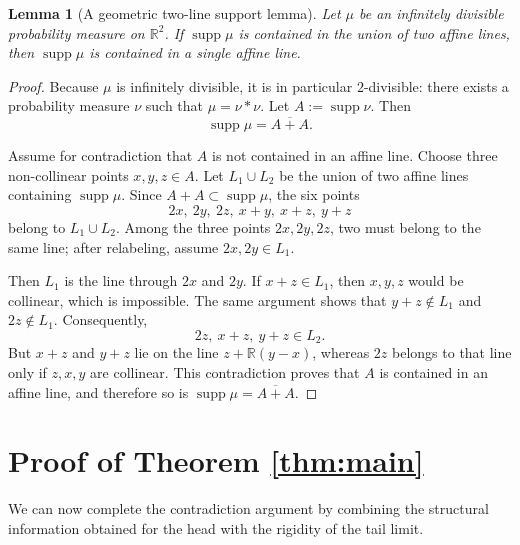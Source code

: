 \documentclass[11pt]{amsart}
\newtheorem{lemma}[theorem]{Lemma}
\newcommand{\R}{\mathbb R}
\newcommand{\supp}{\operatorname{supp}}
\begin{document}
\begin{lemma}[A geometric two-line support lemma]
\label{lem:two-line}
Let $\mu$ be an infinitely divisible probability measure on $\R^2$. If
$\supp \mu$ is contained in the union of two affine lines, then
$\supp \mu$ is contained in a single affine line.
\end{lemma}

\begin{proof}
Because $\mu$ is infinitely divisible, it is in particular $2$-divisible:
there exists a probability measure $\nu$ such that $\mu=\nu * \nu$.
Let $A := \supp \nu$. Then
\[
\supp \mu = \overline{A+A}.
\]

Assume for contradiction that $A$ is not contained in an affine line. Choose
three non-collinear points $x,y,z \in A$. Let $L_1 \cup L_2$ be the union of
two affine lines containing $\supp \mu$. Since $A+A \subset \supp \mu$, the six
points
\[
2x,\ 2y,\ 2z,\ x+y,\ x+z,\ y+z
\]
belong to $L_1 \cup L_2$. Among the three points $2x,2y,2z$, two must belong
to the same line; after relabeling, assume $2x,2y \in L_1$.

Then $L_1$ is the line through $2x$ and $2y$. If $x+z \in L_1$, then $x,y,z$
would be collinear, which is impossible. The same argument shows that
$y+z \notin L_1$ and $2z \notin L_1$. Consequently,
\[
2z,\ x+z,\ y+z \in L_2.
\]
But $x+z$ and $y+z$ lie on the line $z+\R(y-x)$, whereas $2z$ belongs to that
line only if $z,x,y$ are collinear. This contradiction proves that $A$ is
contained in an affine line, and therefore so is
$\supp \mu = \overline{A+A}$.
\end{proof}

\section{Proof of Theorem \ref{thm:main}}

We can now complete the contradiction argument by combining the structural
information obtained for the head with the rigidity of the tail limit.
\end{document}
